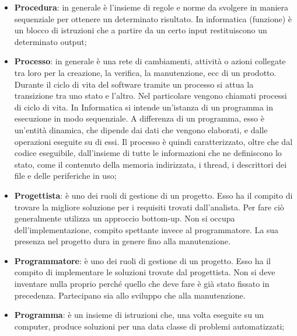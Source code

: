 \begin{itemize}
	\item \textbf{Procedura}: in generale è l'insieme di regole e norme da svolgere in maniera sequenziale per ottenere un determinato risultato. \newline
In informatica (funzione) è un blocco di istruzioni che a partire da un certo input restituiscono un determinato output;

	\item \textbf{Processo}:  in generale è una rete di cambiamenti, attività o azioni collegate tra loro per la creazione, la verifica, la manutenzione, ecc di un prodotto. \newline
Durante il ciclo di vita del software tramite un processo si attua la transizione tra uno stato e l'altro. Nel particolare vengono chiamati processi di ciclo di vita. \newline
In Informatica si intende un'istanza di un programma in esecuzione in modo sequenziale. \newline
A differenza di un programma, esso è un'entità dinamica, che dipende dai dati che vengono elaborati, e dalle operazioni eseguite su di essi. Il processo è quindi caratterizzato, oltre che dal codice eseguibile, dall'insieme di tutte le informazioni che ne definiscono lo stato, come il contenuto della memoria indirizzata, i thread, i descrittori dei file e delle periferiche in uso;
	
	\item \textbf{Progettista}: è uno dei ruoli di gestione di un progetto. \newline
Esso ha il compito di trovare la migliore soluzione per i requisiti trovati dall'analista. Per fare ciò generalmente utilizza un approccio bottom-up. \newline
Non si occupa dell'implementazione, compito spettante invece al programmatore. La sua presenza nel progetto dura in genere fino alla manutenzione.
	
	\item \textbf{Programmatore}: è uno dei ruoli di gestione di un progetto. 	\newline
Esso ha il compito di implementare le soluzioni trovate dal progettista. Non si deve inventare nulla proprio perché quello che deve fare è già stato fissato in precedenza. Partecipano sia allo sviluppo che alla manutenzione.

	\item \textbf{Programma}: è un insieme di istruzioni che, una volta eseguite su un computer, produce soluzioni per una data classe di problemi automatizzati;

\end{itemize}